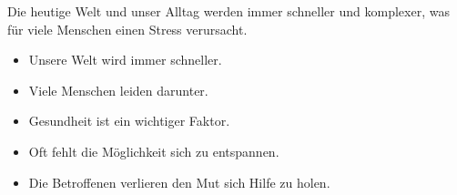 \begin{spacing}{1}
    
    Die heutige Welt und unser Alltag werden immer schneller und komplexer, 
    was für viele Menschen einen Stress verursacht. 

    \begin{itemize}
        \item Unsere Welt wird immer schneller.
        \item Viele Menschen leiden darunter.
        \item Gesundheit ist ein wichtiger Faktor.
        \item Oft fehlt die Möglichkeit sich zu entspannen.
        \item Die Betroffenen verlieren den Mut sich Hilfe zu holen.
    \end{itemize}



\end{spacing}